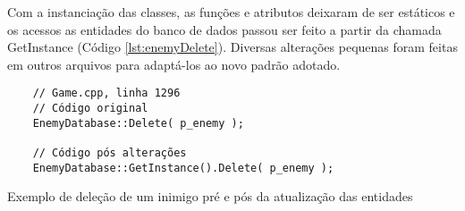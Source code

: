 Com a instanciação das classes, as funções e atributos deixaram de ser estáticos e os acessos 
as entidades do banco de dados passou ser feito a partir da chamada GetInstance (Código \ref{lst:enemyDelete}). 
Diversas alterações pequenas foram feitas em outros arquivos para adaptá-los ao novo padrão adotado.

\begin{listing}[!ht]
    \begin{verbatim}
    // Game.cpp, linha 1296
    // Código original
    EnemyDatabase::Delete( p_enemy );

    // Código pós alterações
    EnemyDatabase::GetInstance().Delete( p_enemy );
    \end{verbatim}
\caption{Exemplo de deleção de um inimigo pré e pós da atualização das entidades}
\label{lst:enemyDelete}
\end{listing}